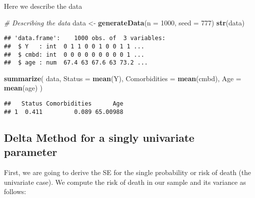 \documentclass[]{article}
\newenvironment{Shaded}{\begin{snugshade}}{\end{snugshade}}
\newcommand{\CommentTok}[1]{\textcolor[rgb]{0.56,0.35,0.01}{\textit{#1}}}
\newcommand{\DataTypeTok}[1]{\textcolor[rgb]{0.13,0.29,0.53}{#1}}
\newcommand{\DecValTok}[1]{\textcolor[rgb]{0.00,0.00,0.81}{#1}}
\newcommand{\KeywordTok}[1]{\textcolor[rgb]{0.13,0.29,0.53}{\textbf{#1}}}
\newcommand{\NormalTok}[1]{#1}
\newcommand{\OperatorTok}[1]{\textcolor[rgb]{0.81,0.36,0.00}{\textbf{#1}}}
\newcommand{\StringTok}[1]{\textcolor[rgb]{0.31,0.60,0.02}{#1}}
\begin{document}
Here we describe the data

\begin{Shaded}
\begin{Highlighting}[]
\CommentTok{# Describing the data}
\NormalTok{data <-}\StringTok{ }\KeywordTok{generateData}\NormalTok{(}\DataTypeTok{n =} \DecValTok{1000}\NormalTok{, }\DataTypeTok{seed =} \DecValTok{777}\NormalTok{) }
\KeywordTok{str}\NormalTok{(data)}
\end{Highlighting}
\end{Shaded}

\begin{verbatim}
## 'data.frame':    1000 obs. of  3 variables:
##  $ Y   : int  0 1 1 0 0 1 0 0 1 1 ...
##  $ cmbd: int  0 0 0 0 0 0 0 0 0 1 ...
##  $ age : num  67.4 63 67.6 63 73.2 ...
\end{verbatim}

\begin{Shaded}
\begin{Highlighting}[]
\KeywordTok{summarize}\NormalTok{(}
\NormalTok{  data,}
  \DataTypeTok{Status =} \KeywordTok{mean}\NormalTok{(Y), }
  \DataTypeTok{Comorbidities =} \KeywordTok{mean}\NormalTok{(cmbd),}
  \DataTypeTok{Age =}  \KeywordTok{mean}\NormalTok{(age)}
\NormalTok{  )}
\end{Highlighting}
\end{Shaded}

\begin{verbatim}
##   Status Comorbidities      Age
## 1  0.411         0.089 65.00988
\end{verbatim}

\hypertarget{delta-method-for-a-singly-univariate-parameter}{%
\subsection{Delta Method for a singly univariate
parameter}\label{delta-method-for-a-singly-univariate-parameter}}

First, we are going to derive the SE for the single probability or risk
of death (the univariate case). We compute the risk of death in our
sample and its variance as follows:

\begin{Shaded}
\end{Shaded}
\end{document}
